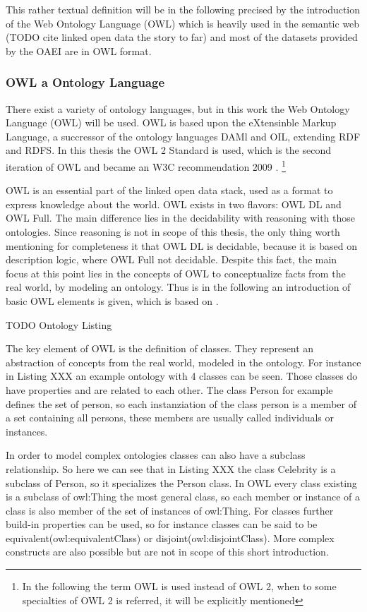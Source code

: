 \documentclass[11pt,titlepage,oneside,openany,a4paper]{report}
\begin{document}
This rather textual definition will be in the following precised by the introduction of the Web Ontology Language (OWL) which is  heavily used in the semantic web (TODO cite linked open data the story to far) and most of the datasets provided by the OAEI are in OWL format. \cite{dragisicresults}
\subsubsection{OWL a Ontology Language}
There exist a variety of ontology languages, but in this work the Web Ontology Language (OWL) will be used. OWL is based upon the eXtensinble Markup Language, a succressor of the ontology languages DAMl and OIL, extending RDF and RDFS. In this thesis the OWL 2 Standard is used, which is the second iteration of OWL and became an W3C recommendation 2009 \cite{OWL2a}. \footnote{In the following the term OWL is used instead of OWL 2, when to some specialties of OWL 2 is referred, it will be explicitly mentioned}

OWL is an essential part of the linked open data stack, used as a format to express knowledge about the world. OWL exists in two flavors: OWL DL and OWL Full. The main difference lies in the decidability with reasoning with those ontologies. Since reasoning is not in scope of this thesis, the only thing worth mentioning for completeness it that OWL DL is decidable, because it is based on description logic, where OWL Full not decidable. Despite this fact, the main focus at this point lies in the concepts of OWL to conceptualize facts from the real world, by modeling an ontology. Thus is in the following an introduction of basic OWL elements is given, which is based on \cite{Antoniou:2012}.

\begin{Huge}
TODO Ontology Listing
\end{Huge}

The key element of OWL is the definition of classes. They represent an abstraction of concepts from the real world, modeled in the ontology. For instance in Listing XXX  an example ontology with 4 classes can be seen. Those classes do have properties and are related to each other. The class Person for example defines the set of person, so each instanziation of the class person is a member of a set containing all persons, these members are usually called individuals or instances.

In order to model complex ontologies classes can also have a subclass relationship. So here we can see that in Listing XXX the class Celebrity is a subclass of Person, so it specializes the Person class. In OWL every class existing is  a subclass of owl:Thing the most general class, so each member or instance of a class is also member of the set of instances of owl:Thing. For classes further build-in properties can be used, so for instance classes can be said to be equivalent(owl:equivalentClass) or disjoint(owl:disjointClass). More complex constructs are also possible but are not in scope of this short introduction.
\end{document}
